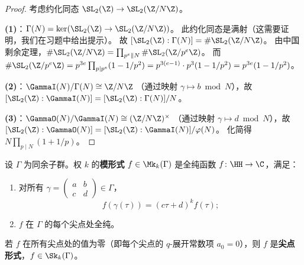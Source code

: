 \begin{proof}
考虑约化同态 $\SL_2(\Z) \to \SL_2(\Z/N\Z)$。

\textbf{(1)}：$\Gamma(N) = \ker(\SL_2(\Z) \to \SL_2(\Z/N\Z))$。
此约化同态是满射（这需要证明，我们在习题中给出提示）。
故 $[\SL_2(\Z) : \Gamma(N)] = \#\SL_2(\Z/N\Z)$。
由中国剩余定理，$\#\SL_2(\Z/N\Z) = \prod_{p^e \| N} \#\SL_2(\Z/p^e\Z)$。
而 $\#\SL_2(\Z/p^e\Z) = p^{3e} \prod_{p \mid p^e}(1 - 1/p^2)
= p^{3(e-1)} \cdot p^3(1 - 1/p^2) = p^{3e}(1 - 1/p^2)$。

\textbf{(2)}：$\GammaI(N)/\Gamma(N) \cong \Z/N\Z$
（通过映射 $\gamma \mapsto b \bmod N$），故
$[\SL_2(\Z) : \GammaI(N)] = [\SL_2(\Z) : \Gamma(N)]/N$。

\textbf{(3)}：$\GammaO(N)/\GammaI(N) \cong (\Z/N\Z)^\times$
（通过映射 $\gamma \mapsto d \bmod N$），故
$[\SL_2(\Z) : \GammaO(N)] = [\SL_2(\Z) : \GammaI(N)]/\varphi(N)$。
化简得 $N \prod_{p \mid N}(1 + 1/p)$。
\end{proof}

\begin{definition}[同余子群上的模形式]
\label{def:modular-forms-congruence}
设 $\Gamma$ 为同余子群。权 $k$ 的\textbf{模形式} $f \in \Mk_k(\Gamma)$
是全纯函数 $f\colon \HH \to \C$，满足：
\begin{enumerate}
  \item 对所有 $\gamma = \begin{pmatrix} a & b \\ c & d \end{pmatrix}
    \in \Gamma$，
    \[
      f(\gamma(\tau)) = (c\tau + d)^k f(\tau);
    \]
  \item $f$ 在 $\Gamma$ 的每个尖点处全纯。
\end{enumerate}
若 $f$ 在所有尖点处的值为零（即每个尖点的 $q$-展开常数项 $a_0 = 0$），则 $f$ 是\textbf{尖点形式}，$f \in \Sk_k(\Gamma)$。
\end{definition}


